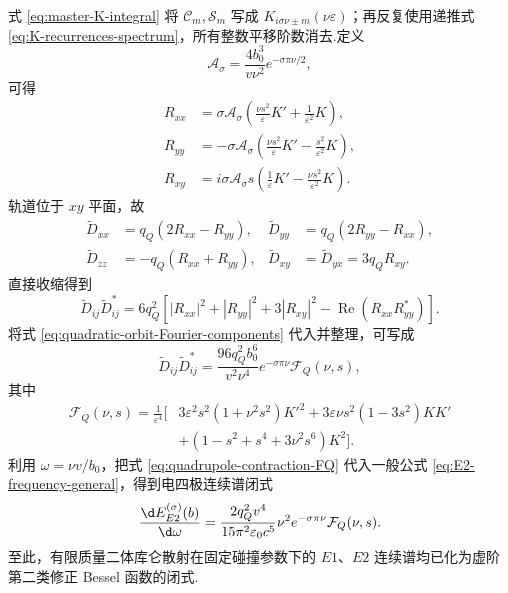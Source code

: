 式 \eqref{eq:master-K-integral} 将 $\mathcal C_m,\mathcal S_m$ 写成 $K_{i\sigma\nu\pm m}(\nu\varepsilon)$；再反复使用递推式 \eqref{eq:K-recurrences-spectrum}，所有整数平移阶数消去.定义
\begin{equation}
 \mathcal A_\sigma=\frac{4b_0^3}{v\nu^2}e^{-\sigma\pi\nu/2},
\end{equation}
可得
\begin{equation}
 \begin{aligned}
 R_{xx}&=\sigma\mathcal A_\sigma
 \left(\frac{\nu s^2}{\varepsilon}K'+\frac{1}{\varepsilon^2}K\right),\\
 R_{yy}&=-\sigma\mathcal A_\sigma
 \left(\frac{\nu s^2}{\varepsilon}K'-\frac{s^2}{\varepsilon^2}K\right),\\
 R_{xy}&=i\sigma\mathcal A_\sigma s
 \left(\frac{1}{\varepsilon}K'-\frac{\nu s^2}{\varepsilon^2}K\right).
 \end{aligned}
 \label{eq:quadratic-orbit-Fourier-components}
\end{equation}
轨道位于 $xy$ 平面，故
\begin{equation}
 \begin{aligned}
 \widetilde D_{xx}&=q_Q(2R_{xx}-R_{yy}),
 &\widetilde D_{yy}&=q_Q(2R_{yy}-R_{xx}),\\
 \widetilde D_{zz}&=-q_Q(R_{xx}+R_{yy}),
 &\widetilde D_{xy}&=\widetilde D_{yx}=3q_QR_{xy}.
 \end{aligned}
 \label{eq:quadrupole-components-from-R}
\end{equation}
直接收缩得到
\begin{equation}
 \widetilde D_{ij}\widetilde D_{ij}^*
 =6q_Q^2\left[
 |R_{xx}|^2+|R_{yy}|^2+3|R_{xy}|^2
 -\operatorname{Re}(R_{xx}R_{yy}^*)
 \right].
 \label{eq:quadrupole-contraction-Fourier}
\end{equation}
将式 \eqref{eq:quadratic-orbit-Fourier-components} 代入并整理，可写成
\begin{equation}
 \widetilde D_{ij}\widetilde D_{ij}^*
 =\frac{96q_Q^2b_0^6}{v^2\nu^4}e^{-\sigma\pi\nu}\mathcal F_Q(\nu,s),
 \label{eq:quadrupole-contraction-FQ}
\end{equation}
其中
\begin{equation}
 \begin{aligned}
 \mathcal F_Q(\nu,s)=\frac{1}{\varepsilon^4}\bigg[&
 3\varepsilon^2s^2(1+\nu^2s^2)K'^2
 +3\varepsilon\nu s^2(1-3s^2)KK'\\
 &+\left(1-s^2+s^4+3\nu^2s^6\right)K^2
 \bigg].
 \end{aligned}
 \label{eq:FQ-definition}
\end{equation}
利用 $\omega=\nu v/b_0$，把式 \eqref{eq:quadrupole-contraction-FQ} 代入一般公式 \eqref{eq:E2-frequency-general}，得到电四极连续谱闭式
\begin{equation}
 \frac{\d E_{E2}^{(\sigma)}(b)}{\d\omega}
 =\frac{2q_Q^2v^4}{15\pi^2\varepsilon_0c^5}
 \nu^2e^{-\sigma\pi\nu}\mathcal F_Q(\nu,s).
 \label{eq:exact-E2-fixed-b-spectrum}
\end{equation}
至此，有限质量二体库仑散射在固定碰撞参数下的 $E1$、$E2$ 连续谱均已化为虚阶第二类修正 Bessel 函数的闭式.

